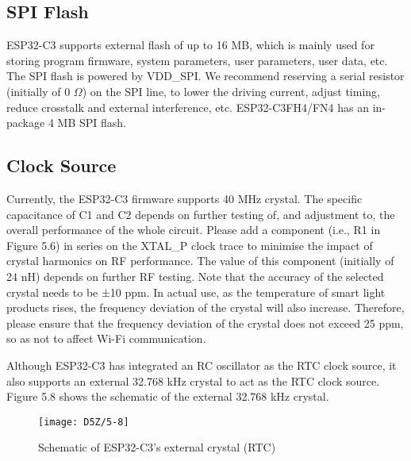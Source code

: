 \documentclass[a4paper,12pt]{book}
\begin{document}
\subsection{SPI Flash}
ESP32-C3 supports external flash of up to 16 MB, which is mainly used for storing program firmware, system parameters, user parameters, user data, etc. The SPI flash is powered by VDD\_SPI. We recommend reserving a serial resistor (initially of 0 $\Omega$) on the SPI line, to lower the driving current, adjust timing, reduce crosstalk and external interference, etc. ESP32-C3FH4/FN4 has an in-package 4 MB SPI flash.

\subsection{Clock Source}
Currently, the ESP32-C3 firmware supports 40 MHz crystal. The specific capacitance of C1 and C2 depends on further testing of, and adjustment to, the overall performance of the whole circuit. Please add a component (i.e., R1 in Figure 5.6) in series on the XTAL\_P clock trace to minimise the impact of crystal harmonics on RF performance. The value of this component (initially of 24 nH) depends on further RF testing. Note that the accuracy of the selected crystal needs to be ±10 ppm. In actual use, as the temperature of smart light products rises, the frequency deviation of the crystal will also increase. Therefore, please ensure that the frequency deviation of the crystal does not exceed 25 ppm, so as not to affect Wi-Fi communication.

Although ESP32-C3 has integrated an RC oscillator as the RTC clock source, it also supports an external 32.768 kHz crystal to act as the RTC clock source. Figure 5.8 shows the schematic of the external 32.768 kHz crystal.

\begin{figure}[h!]
    \centering
    \texttt{[image: D5Z/5-8]}
    \caption{Schematic of ESP32-C3’s external crystal (RTC)}
\end{figure}

\end{document}
